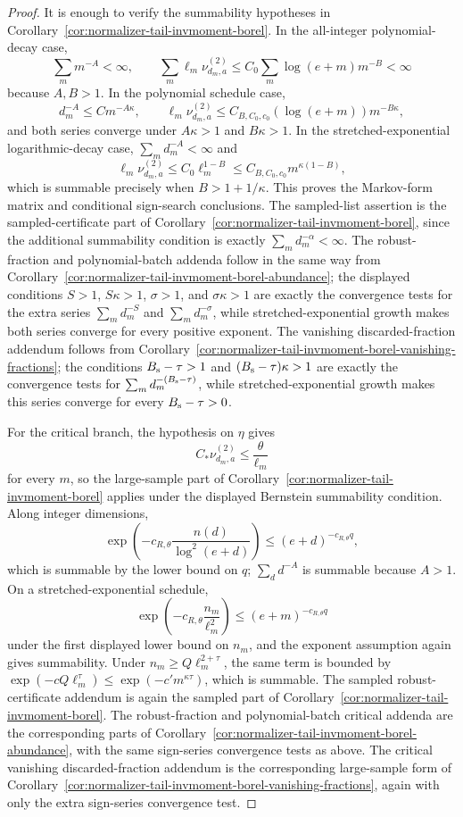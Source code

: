 \documentclass[11pt]{amsart}
\numberwithin{equation}{section}
\theoremstyle{definition}
\theoremstyle{remark}
\begin{document}
\begin{proof}
It is enough to verify the summability hypotheses in
Corollary~\ref{cor:normalizer-tail-invmoment-borel}.  In the all-integer
polynomial-decay case,
\[
  \sum_m m^{-A}<\infty,
  \qquad
  \sum_m \ell_m\nu_{d_m,a}^{(2)}
  \le C_0\sum_m \log(e+m)m^{-B}<\infty
\]
because \(A,B>1\).  In the polynomial schedule case,
\[
  d_m^{-A}\le C m^{-A\kappa},
  \qquad
  \ell_m\nu_{d_m,a}^{(2)}
  \le C_{B,C_0,c_0}(\log(e+m))m^{-B\kappa},
\]
and both series converge under \(A\kappa>1\) and \(B\kappa>1\).  In the
stretched-exponential logarithmic-decay case, \(\sum_m d_m^{-A}<\infty\) and
\[
  \ell_m\nu_{d_m,a}^{(2)}
  \le C_0\ell_m^{1-B}
  \le C_{B,C_0,c_0}m^{\kappa(1-B)},
\]
which is summable precisely when \(B>1+1/\kappa\).  This proves the
Markov-form matrix and conditional sign-search conclusions.  The sampled-list
assertion is the sampled-certificate part of
Corollary~\ref{cor:normalizer-tail-invmoment-borel}, since the additional
summability condition is exactly \(\sum_m d_m^{-\alpha}<\infty\).
The robust-fraction and polynomial-batch addenda follow in the same way from
Corollary~\ref{cor:normalizer-tail-invmoment-borel-abundance}; the displayed
conditions \(S>1\), \(S\kappa>1\), \(\sigma>1\), and \(\sigma\kappa>1\) are
exactly the convergence tests for the extra series \(\sum_m d_m^{-S}\) and
\(\sum_m d_m^{-\sigma}\), while stretched-exponential growth makes both series
converge for every positive exponent.
The vanishing discarded-fraction addendum follows from
Corollary~\ref{cor:normalizer-tail-invmoment-borel-vanishing-fractions}; the
conditions \(B_{\rm s}-\tau>1\) and \((B_{\rm s}-\tau)\kappa>1\) are exactly the
convergence tests for \(\sum_m d_m^{-(B_{\rm s}-\tau)}\), while
stretched-exponential growth makes this series converge for every
\(B_{\rm s}-\tau>0\).

For the critical branch, the hypothesis on \(\eta\) gives
\[
  C_*\nu_{d_m,a}^{(2)}\le\frac{\theta}{\ell_m}
\]
for every \(m\), so the large-sample part of
Corollary~\ref{cor:normalizer-tail-invmoment-borel} applies under the displayed
Bernstein summability condition.  Along integer dimensions,
\[
  \exp\left(-c_{R,\theta}\frac{n(d)}{\log^2(e+d)}\right)
  \le (e+d)^{-c_{R,\theta}q},
\]
which is summable by the lower bound on \(q\); \(\sum_d d^{-A}\) is summable
because \(A>1\).  On a stretched-exponential schedule,
\[
  \exp\left(-c_{R,\theta}\frac{n_m}{\ell_m^2}\right)
  \le (e+m)^{-c_{R,\theta}q}
\]
under the first displayed lower bound on \(n_m\), and the exponent assumption
again gives summability.  Under \(n_m\ge Q\ell_m^{2+\tau}\), the same term is
bounded by \(\exp(-cQ\ell_m^\tau)\le\exp(-c' m^{\kappa\tau})\), which is
summable.  The sampled robust-certificate addendum is again the sampled part of
Corollary~\ref{cor:normalizer-tail-invmoment-borel}.
The robust-fraction and polynomial-batch critical addenda are the corresponding
parts of Corollary~\ref{cor:normalizer-tail-invmoment-borel-abundance}, with the
same sign-series convergence tests as above.
The critical vanishing discarded-fraction addendum is the corresponding
large-sample form of
Corollary~\ref{cor:normalizer-tail-invmoment-borel-vanishing-fractions}, again
with only the extra sign-series convergence test.
\end{proof}
\end{document}
